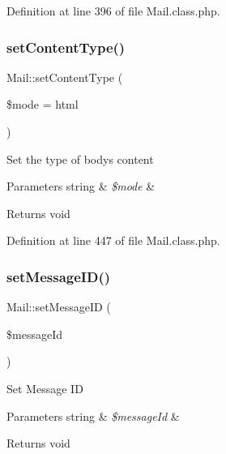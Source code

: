 Definition at line 396 of file Mail.\+class.\+php.

\mbox{\label{classMail_a326329d653ba8e831c724471189e41e3}} 
\subsubsection{\texorpdfstring{set\+Content\+Type()}{setContentType()}}
{\footnotesize\ttfamily Mail\+::set\+Content\+Type (\begin{DoxyParamCaption}\item[{}]{\$mode = {\ttfamily \textquotesingle{}html\textquotesingle{}} }\end{DoxyParamCaption})}

Set the type of body\textquotesingle{}s content


\begin{DoxyParams}[1]{Parameters}
string & {\em \$mode} & \\
\hline
\end{DoxyParams}
\begin{DoxyReturn}{Returns}
void 
\end{DoxyReturn}


Definition at line 447 of file Mail.\+class.\+php.

\mbox{\label{classMail_a51becbf02e5e415277fa8f4049ece136}} 
\subsubsection{\texorpdfstring{set\+Message\+I\+D()}{setMessageID()}}
{\footnotesize\ttfamily Mail\+::set\+Message\+ID (\begin{DoxyParamCaption}\item[{}]{\$message\+Id }\end{DoxyParamCaption})}

Set Message ID


\begin{DoxyParams}[1]{Parameters}
string & {\em \$message\+Id} & \\
\hline
\end{DoxyParams}
\begin{DoxyReturn}{Returns}
void 
\end{DoxyReturn}


